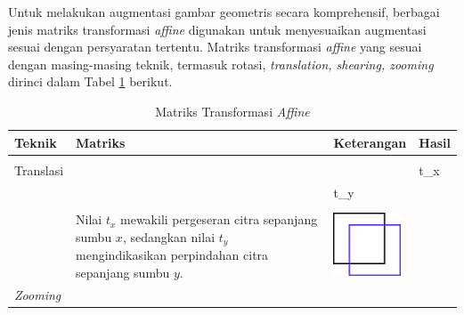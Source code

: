     
        

        Untuk melakukan augmentasi gambar geometris secara komprehensif, berbagai jenis matriks 
        transformasi \textit{affine} digunakan untuk menyesuaikan augmentasi sesuai dengan persyaratan tertentu.
         Matriks transformasi \textit{affine} yang sesuai dengan masing-masing teknik, termasuk rotasi,
          \textit{translation, shearing, zooming} dirinci 
          dalam Tabel  \ref{Matriks Transformasi Afin pada Operasi Lainnya} berikut.
        
\begin{table}[H]
    \centering
    \caption{Matriks Transformasi \textit{Affine}}
    \label{Matriks Transformasi Afin pada Operasi Lainnya}
    \begin{tabular}{
        >{\raggedright\arraybackslash}m{1.0cm} 
        >{\centering\arraybackslash}m{3.5cm} 
        >{\raggedright\arraybackslash}m{4.5cm}  
        >{\centering\arraybackslash}m{3.0cm}}
        \hline
        \textbf{Teknik} & \textbf{Matriks} & \textbf{Keterangan} & \textbf{Hasil} \\
        \hline \\
        Translasi & 
        \(\begin{bmatrix}
            1 & 0 & t_x \\
            0 & 1 & t_y \\
            0 & 0 & 1 \\
        \end{bmatrix}\)
        
        & 
        
        Nilai $t_x$ mewakili pergeseran citra sepanjang sumbu $x$, sedangkan nilai $t_y$ mengindikasikan perpindahan citra sepanjang sumbu $y$.
        
        &
        
     \includegraphics[width=2.0cm, height=2.0cm, keepaspectratio]{figures/bab2/translasi} \\
        
        \textit{Zooming}
        
        & 
        

\end{tabular}
\end{table}
